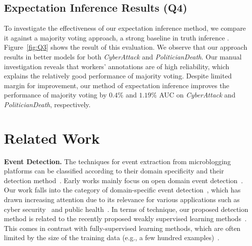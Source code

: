 \documentclass[letterpaper]{article}
\begin{document}
\subsection{Expectation Inference Results (Q4)}
To investigate the effectiveness of our expectation inference method, we compare it against a majority voting approach, a strong baseline in truth inference \cite{zheng2017truth}. Figure~\ref{fig:Q3} shows the result of this evaluation. We observe that our approach results in better models for both \emph{CyberAttack} and \emph{PoliticianDeath}. Our manual investigation reveals that workers' annotations are of high reliability, which explains the relatively good performance of majority voting. Despite limited margin for improvement, our method of expectation inference improves the performance of majority voting by $0.4\%$ and $1.19\%$ AUC on \emph{CyberAttack} and \emph{PoliticianDeath}, respectively.

\section{Related Work}
\label{sec:related}

\noindent\textbf{Event Detection.}
The techniques for event extraction from microblogging platforms can be classified according to their domain specificity and their detection method~\cite{atefeh2015survey}. Early works mainly focus on open domain event detection~\cite{benson2011event,ritter2012open,chierichetti2014event}. Our work falls into the category of domain-specific event detection~\cite{bhardwaj2019TKDE}, which has drawn increasing attention due to its relevance for various applications such as cyber security~\cite{ritter2015weakly,chambers2018detecting} and public health~\cite{akbari2016tweets,lee2017adverse}. In terms of  technique, our proposed detection method is related to the recently proposed weakly supervised learning methods~\cite{ritter2015weakly,chang2016expectation,konovalov2017learning}. This comes in contrast with fully-supervised learning methods, which are often limited by the size of the training data (e.g., a few hundred examples)~\cite{sakaki2010earthquake,sadri2016online}.
\end{document}
